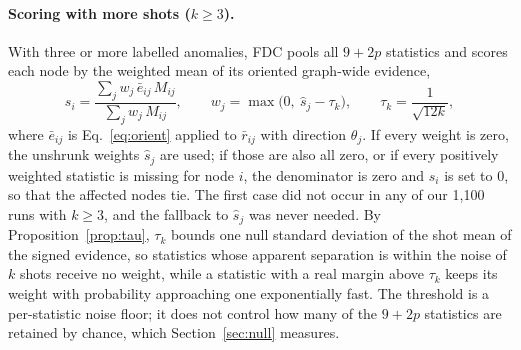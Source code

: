 \documentclass[pdflatex,sn-mathphys-ay]{sn-jnl}
\theoremstyle{plain}
\theoremstyle{remark}
\begin{document}
\paragraph{Scoring with more shots ($k\ge3$).} With three or more labelled anomalies, FDC pools all $9+2p$ statistics and scores each node by the weighted mean of its oriented graph-wide evidence,
\begin{equation}\label{eq:fdc}
s_i=\frac{\sum_j w_j\,\bar e_{ij}\,M_{ij}}{\sum_j w_j\,M_{ij}},\qquad w_j=\max\big(0,\ \hat s_j-\tau_k\big),\qquad \tau_k=\frac{1}{\sqrt{12k}},
\end{equation}
where $\bar e_{ij}$ is Eq.~\eqref{eq:orient} applied to $\bar r_{ij}$ with direction $\theta_j$. If every weight is zero, the unshrunk weights $\hat s_j$ are used; if those are also all zero, or if every positively weighted statistic is missing for node $i$, the denominator is zero and $s_i$ is set to 0, so that the affected nodes tie. The first case did not occur in any of our 1{,}100 runs with $k\ge3$, and the fallback to $\hat s_j$ was never needed. By Proposition~\ref{prop:tau}, $\tau_k$ bounds one null standard deviation of the shot mean of the signed evidence, so statistics whose apparent separation is within the noise of $k$ shots receive no weight, while a statistic with a real margin above $\tau_k$ keeps its weight with probability approaching one exponentially fast. The threshold is a per-statistic noise floor; it does not control how many of the $9+2p$ statistics are retained by chance, which Section~\ref{sec:null} measures.
\end{document}
